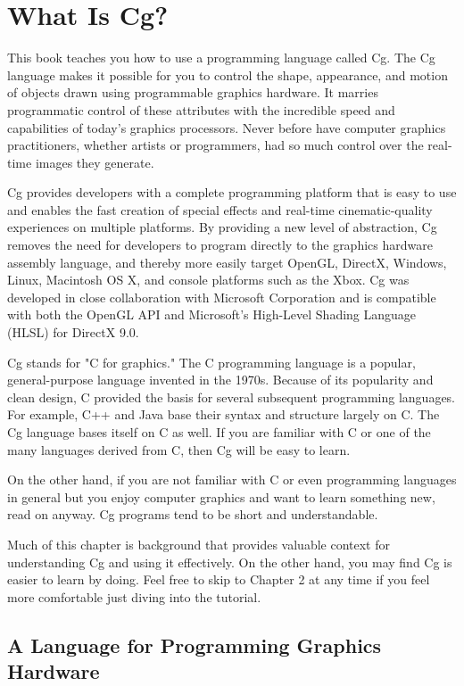 \documentclass{book}
\begin{document}
\section{What Is Cg?}

This book teaches you how to use a programming language called Cg. The Cg language makes it possible for you to control the shape, appearance, and motion of objects drawn using programmable graphics hardware. It marries programmatic control of these attributes with the incredible speed and capabilities of today's graphics processors. Never before have computer graphics practitioners, whether artists or programmers, had so much control over the real-time images they generate.

Cg provides developers with a complete programming platform that is easy to use and enables the fast creation of special effects and real-time cinematic-quality experiences on multiple platforms. By providing a new level of abstraction, Cg removes the need for developers to program directly to the graphics hardware assembly language, and thereby more easily target OpenGL, DirectX, Windows, Linux, Macintosh OS X, and console platforms such as the Xbox. Cg was developed in close collaboration with Microsoft Corporation and is compatible with both the OpenGL API and Microsoft's High-Level Shading Language (HLSL) for DirectX 9.0.

Cg stands for "C for graphics." The C programming language is a popular, general-purpose language invented in the 1970s. Because of its popularity and clean design, C provided the basis for several subsequent programming languages. For example, C++ and Java base their syntax and structure largely on C. The Cg language bases itself on C as well. If you are familiar with C or one of the many languages derived from C, then Cg will be easy to learn.

On the other hand, if you are not familiar with C or even programming languages in general but you enjoy computer graphics and want to learn something new, read on anyway. Cg programs tend to be short and understandable.

Much of this chapter is background that provides valuable context for understanding Cg and using it effectively. On the other hand, you may find Cg is easier to learn by doing. Feel free to skip to Chapter 2 at any time if you feel more comfortable just diving into the tutorial.

\subsection{A Language for Programming Graphics Hardware}
\end{document}
